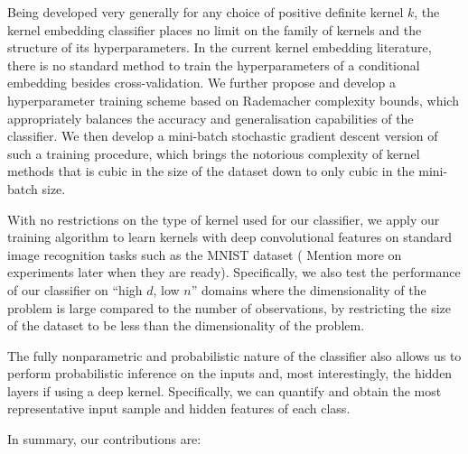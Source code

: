 \documentclass{article}
\newcommand{\note}[1]{{\color{orange} #1}}
\begin{document}
	Being developed very generally for any choice of positive definite kernel $k$, the kernel embedding classifier places no limit on the family of kernels and the structure of its hyperparameters. In the current kernel embedding literature, there is no standard method to train the hyperparameters of a conditional embedding besides cross-validation. We further propose and develop a hyperparameter training scheme based on Rademacher complexity bounds, which appropriately balances the accuracy and generalisation capabilities of the classifier. We then develop a mini-batch stochastic gradient descent version of such a training procedure, which brings the notorious complexity of kernel methods that is cubic in the size of the dataset down to only cubic in the mini-batch size.
	
	With no restrictions on the type of kernel used for our classifier, we apply our training algorithm to learn kernels with deep convolutional features on standard image recognition tasks such as the MNIST dataset (\note{Mention more on experiments later when they are ready}). Specifically, we also test the performance of our classifier on ``high $d$, low $n$'' domains where the dimensionality of the problem is large compared to the number of observations, by restricting the size of the dataset to be less than the dimensionality of the problem.
	
	The fully nonparametric and probabilistic nature of the classifier also allows us to perform probabilistic inference on the inputs and, most interestingly, the hidden layers if using a deep kernel. Specifically, we can quantify and obtain the most representative input sample and hidden features of each class.
	
	In summary, our contributions are:
	
\end{document}
